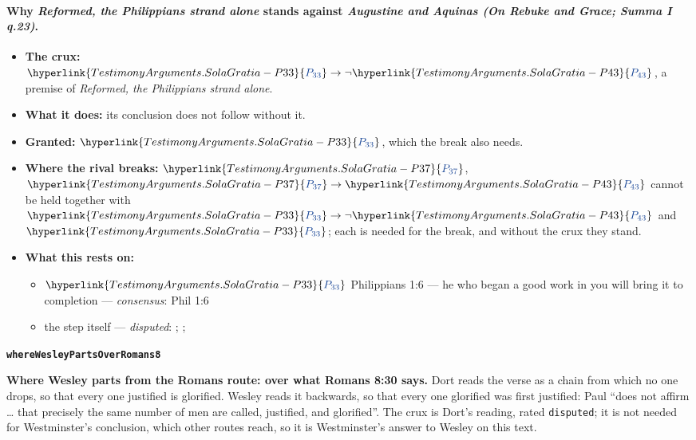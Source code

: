\documentclass[11pt]{article}
\newcommand{\pvar}[2]{\hyperlink{#1-P#2}{\textcolor{claimlink}{P_{#2}}}}
\begin{document}
\paragraph{Why \emph{Reformed, the Philippians strand alone} stands against \emph{Augustine and Aquinas (On Rebuke and Grace; Summa I q.23)}.}
\begin{itemize}
\item \textbf{The crux:} \(\pvar{TestimonyArguments.SolaGratia}{33} \rightarrow \lnot \pvar{TestimonyArguments.SolaGratia}{43}\), a premise of \emph{Reformed, the Philippians strand alone}.
\item \textbf{What it does:} its conclusion does not follow without it.
\item \textbf{Granted:} \(\pvar{TestimonyArguments.SolaGratia}{33}\), which the break also needs.
\item \textbf{Where the rival breaks:} \(\pvar{TestimonyArguments.SolaGratia}{37}\), \(\pvar{TestimonyArguments.SolaGratia}{37} \rightarrow \pvar{TestimonyArguments.SolaGratia}{43}\) cannot be held together with \(\pvar{TestimonyArguments.SolaGratia}{33} \rightarrow \lnot \pvar{TestimonyArguments.SolaGratia}{43}\) and \(\pvar{TestimonyArguments.SolaGratia}{33}\); each is needed for the break, and without the crux they stand.
\item \textbf{What this rests on:}
\begin{itemize}
\item \(\pvar{TestimonyArguments.SolaGratia}{33}\) Philippians 1:6 — he who began a good work in you will bring it to completion --- \emph{consensus}: Phil 1:6
\item the step itself --- \emph{disputed}: \cite[Trent, Session VI (1547), ch. 13]{tanner-decrees-1990}; \cite[40]{waterworth-trent-1848}; \cite[Solid Declaration XI.42]{concordia-triglotta-1921}
\end{itemize}
\end{itemize}
\par\medskip\noindent\textbf{\texttt{where\allowbreak{}Wesley\allowbreak{}Parts\allowbreak{}Over\allowbreak{}Romans8}}\par\nobreak\noindent
\textbf{Where Wesley parts from the Romans route: over what Romans 8:30 says.} Dort reads the verse as a chain from which no one drops, so that every one justified is glorified. Wesley reads it backwards, so that every one glorified was first justified: Paul “does not affirm … that precisely the same number of men are called, justified, and glorified”. The crux is Dort’s reading, rated \texttt{disputed}; it is not needed for Westminster’s conclusion, which other routes reach, so it is Westminster’s answer to Wesley on this text.
\end{document}
